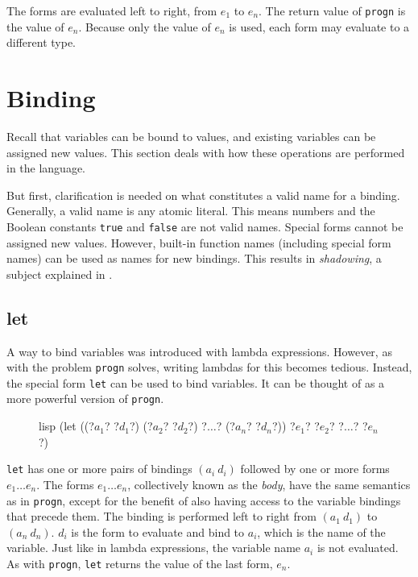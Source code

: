 \documentclass[a4paper, 12pt]{article}
\begin{document}
The forms are evaluated left to right, from $e_1$ to $e_n$. The return value of \texttt{progn} is the value of $e_n$. Because only the value of $e_n$ is used, each form may evaluate to a different type.

\section{Binding}\label{subsec:bindingassign}
Recall that variables can be bound to values, and existing variables can be assigned new values. This section deals with how these operations are performed in the language.

But first, clarification is needed on what constitutes a valid name for a binding. Generally, a valid name is any atomic literal. This means numbers and the Boolean constants \texttt{true} and \texttt{false} are not valid names. Special forms cannot be assigned new values. However, built-in function names (including special form names) can be used as names for new bindings. This results in \textit{shadowing}, a subject explained in .

\subsection{let}
A way to bind variables was introduced with lambda expressions. However, as with the problem \texttt{progn} solves, writing lambdas for this becomes tedious. Instead, the special form \texttt{let} can be used to bind variables. It can be thought of as a more powerful version of \texttt{progn}.

\begin{figure}[htp]
    \centering
    \begin{cminted}[autogobble=true, escapeinside=??]{lisp}
        (let ((?$a_1$? ?$d_1$?) (?$a_2$? ?$d_2$?) ?$\ldots$? (?$a_n$? ?$d_n$?)) ?$e_1$? ?$e_2$? ?$\ldots$? ?$e_n$?)
    \end{cminted}
    \captionsetup[figure]{font=small}
\end{figure}

\texttt{let} has one or more pairs of bindings $(a_i\ d_i)$ followed by one or more forms $e_1 \ldots e_n$. The forms $e_1 \ldots e_n$, collectively known as the \textit{body}, have the same semantics as in \texttt{progn}, except for the benefit of also having access to the variable bindings that precede them. The binding is performed left to right from $(a_1\ d_1)$ to $(a_n\ d_n)$. $d_i$ is the form to evaluate and bind to $a_i$, which is the name of the variable. Just like in lambda expressions, the variable name $a_i$ is not evaluated. As with \texttt{progn}, \texttt{let} returns the value of the last form, $e_n$.
\end{document}

